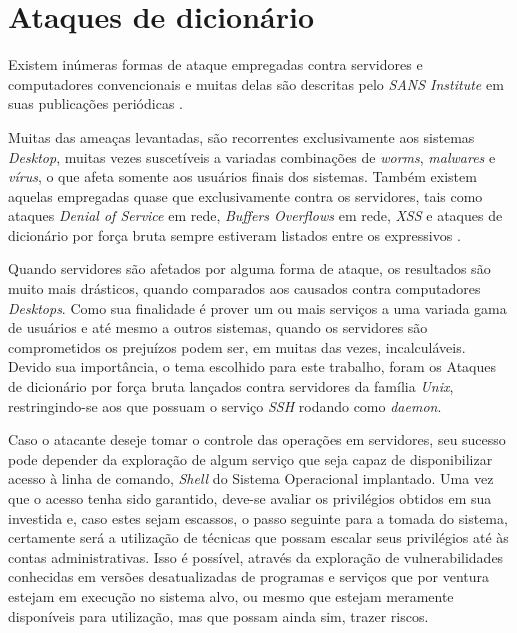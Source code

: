 \chapter{Ataques de dicionário}\label{1_ataques_servidores}

Existem inúmeras formas de ataque empregadas contra servidores e computadores convencionais e muitas delas são descritas pelo \textit{SANS Institute} em suas publicações periódicas \cite{Top20Sans}.

Muitas das ameaças levantadas, são recorrentes exclusivamente aos sistemas \textit{Desktop}, muitas vezes suscetíveis a variadas combinações de \textit{worms}, \textit{malwares} e \textit{vírus}, o que afeta somente aos usuários finais dos sistemas. Também existem aquelas empregadas quase que exclusivamente contra os servidores, tais como ataques \textit{Denial of Service} em rede, \textit{Buffers Overflows} em rede, \textit{XSS} e ataques de dicionário por força bruta sempre estiveram listados entre os expressivos \cite{Top10Sans} \cite{Top20Sans}.

Quando servidores são afetados por alguma forma de ataque, os resultados são muito mais drásticos, quando comparados aos causados contra computadores \textit{Desktops}. Como sua finalidade é prover um ou mais serviços a uma variada gama de usuários e até mesmo a outros sistemas, quando os servidores são comprometidos os prejuízos podem ser, em muitas das vezes, incalculáveis. Devido sua importância, o tema escolhido para este trabalho, foram os Ataques de dicionário por força bruta lançados contra servidores da família \textit{Unix}, restringindo-se aos que possuam o serviço \textit{SSH} \cite{OpenSSH} rodando como \textit{daemon}.

Caso o atacante deseje tomar o controle das operações em servidores, seu sucesso pode depender da exploração de algum serviço que seja capaz de disponibilizar acesso à linha de comando, \textit{Shell} do Sistema Operacional implantado. Uma vez que o acesso tenha sido garantido, deve-se avaliar os privilégios obtidos em sua investida e, caso estes sejam escassos, o passo seguinte para a tomada do sistema, certamente será a utilização de técnicas que possam escalar seus privilégios até às contas administrativas. Isso é possível, através da exploração de vulnerabilidades conhecidas em versões desatualizadas  de programas e serviços que por ventura estejam em execução no sistema alvo, ou mesmo que estejam meramente disponíveis para utilização, mas que possam ainda sim, trazer riscos. \cite{PrivilegeEscalation}


